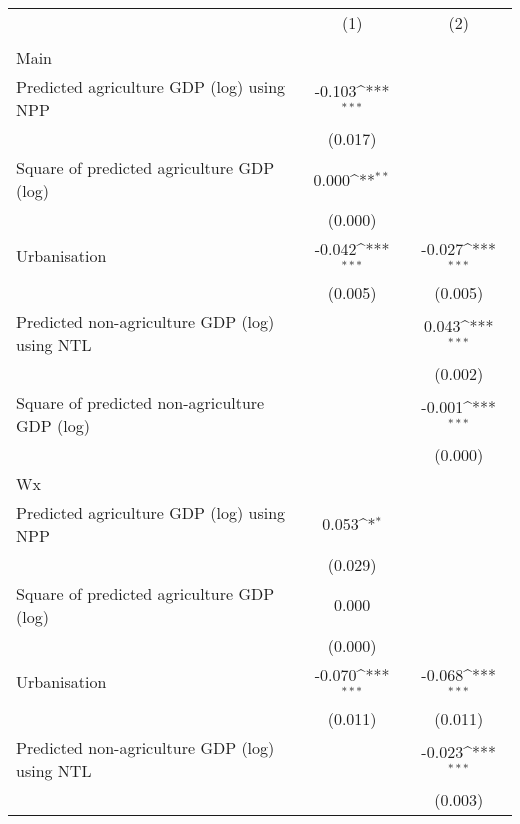 {
\def\sym#1{\ifmmode^{#1}\else\(^{#1}\)\fi}
\begin{tabular}{l*{2}{c}}
\hline\hline
                    &\multicolumn{1}{c}{(1)}&\multicolumn{1}{c}{(2)}\\
                    &\multicolumn{1}{c}{ }&\multicolumn{1}{c}{ }\\
\hline
Main                &                     &                     \\
Predicted agriculture GDP (log) using NPP&      -0.103\sym{***}&                     \\
                    &     (0.017)         &                     \\
[1em]
Square of predicted agriculture GDP (log)&       0.000\sym{**} &                     \\
                    &     (0.000)         &                     \\
[1em]
Urbanisation        &      -0.042\sym{***}&      -0.027\sym{***}\\
                    &     (0.005)         &     (0.005)         \\
[1em]
Predicted non-agriculture GDP (log) using NTL&                     &       0.043\sym{***}\\
                    &                     &     (0.002)         \\
[1em]
Square of predicted non-agriculture GDP (log)&                     &      -0.001\sym{***}\\
                    &                     &     (0.000)         \\
\hline
Wx                  &                     &                     \\
Predicted agriculture GDP (log) using NPP&       0.053\sym{*}  &                     \\
                    &     (0.029)         &                     \\
[1em]
Square of predicted agriculture GDP (log)&       0.000         &                     \\
                    &     (0.000)         &                     \\
[1em]
Urbanisation        &      -0.070\sym{***}&      -0.068\sym{***}\\
                    &     (0.011)         &     (0.011)         \\
[1em]
Predicted non-agriculture GDP (log) using NTL&                     &      -0.023\sym{***}\\
                    &                     &     (0.003)         \\

\end{tabular}}
